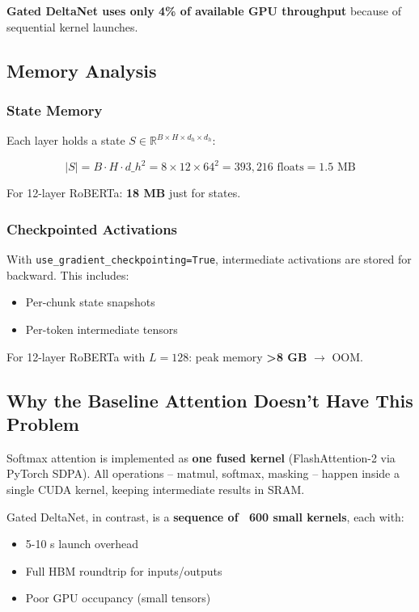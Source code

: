 \textbf{Gated DeltaNet uses only 4\% of available GPU throughput} because of 
sequential kernel launches.

\subsection{Memory Analysis}

\subsubsection{State Memory}

Each layer holds a state $S \in \mathbb{R}^{B \times H \times d_h \times d_h}$:

\[
|S| = B \cdot H \cdot d\_h^2 = 8 \times 12 \times 64^2 = 393,216 \text{ floats} 
= 1.5 \text{ MB}
\]

For 12-layer RoBERTa: \textbf{18 MB} just for states.

\subsubsection{Checkpointed Activations}

With \texttt{use\_gradient\_checkpointing=True}, intermediate activations are stored 
for backward. This includes:
\begin{itemize}
\item Per-chunk state snapshots
\item Per-token intermediate tensors

\end{itemize}
For 12-layer RoBERTa with $L=128$: peak memory \textbf{\textgreater{}8 GB} $\to$ OOM.

\subsection{Why the Baseline Attention Doesn't Have This Problem}

Softmax attention is implemented as \textbf{one fused kernel} (FlashAttention-2 
via PyTorch SDPA). All operations -- matmul, softmax, masking -- happen 
inside a single CUDA kernel, keeping intermediate results in SRAM.

Gated DeltaNet, in contrast, is a \textbf{sequence of ~600 small kernels}, each 
with:
\begin{itemize}
\item 5-10  s launch overhead
\item Full HBM roundtrip for inputs/outputs
\item Poor GPU occupancy (small tensors)

\end{itemize}
